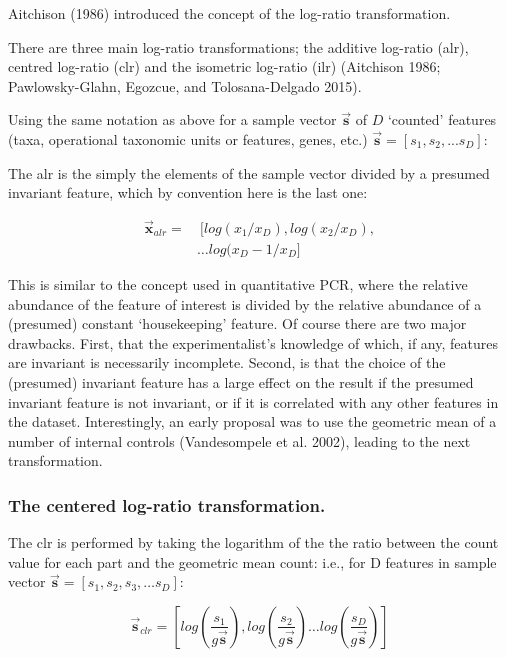 \documentclass[onecolumn]{article}
\newcommand{\vect}[1]{\vec{\textbf{#1}}}
\begin{document}
Aitchison (1986) introduced the concept of the log-ratio transformation.

There are three main log-ratio transformations; the additive log-ratio (alr), centred log-ratio (clr) and the isometric log-ratio (ilr) (Aitchison 1986; Pawlowsky-Glahn, Egozcue, and Tolosana-Delgado 2015).

Using the same notation as above for a sample vector \(\vec{\textbf{s}}\) of \(D\) `counted' features (taxa, operational taxonomic units or features, genes, etc.) \(\vec{\textbf{s}}=[s_1, s_2, ... s_D]\):

The alr is the simply the elements of the sample vector divided by a presumed invariant feature, which by convention here is the last one:

\begin{equation}
\begin{aligned}
 \vec{\textbf{x}}_{alr}= &\ [log(x_1/x_D), log(x_2/x_D), \\
 & \ldots log(x_D-1/x_D]
\end{aligned}
 \label{eq:alr}
\end{equation}

This is similar to the concept used in quantitative PCR, where the relative abundance of the feature of interest is divided by the relative abundance of a (presumed) constant `housekeeping' feature. Of course there are two major drawbacks. First, that the experimentalist's knowledge of which, if any, features are invariant is necessarily incomplete. Second, is that the choice of the (presumed) invariant feature has a large effect on the result if the presumed invariant feature is not invariant, or if it is correlated with any other features in the dataset. Interestingly, an early proposal was to use the geometric mean of a number of internal controls (Vandesompele et al. 2002), leading to the next transformation.

\hypertarget{the-centered-log-ratio-transformation.}{%
\subsubsection{The centered log-ratio transformation.}\label{the-centered-log-ratio-transformation.}}

The clr is performed by taking the logarithm of the the ratio between the count value for each part and the geometric mean count: i.e., for D features in sample vector \(\vect{s} = [s_1, s_2, s_3, \ldots s_D]\):

\begin{equation}
 \vect{s}_{clr}  = [log(\frac{s_1}{g\vect{s}}), log(\frac{s_2}{g\vect{s}}) \ldots log(\frac{s_D}{g\vect{s}})]
\end{equation}
\end{document}
